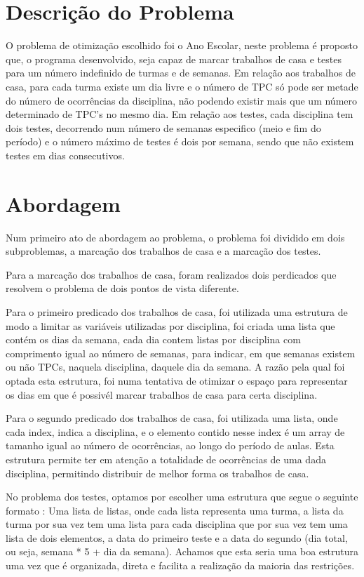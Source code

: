 \documentclass{llncs}
\begin{document}
\section{Descrição do Problema}
%
O problema de otimização escolhido foi o Ano Escolar, neste problema é proposto que, o programa desenvolvido, seja capaz de marcar trabalhos de casa e testes para um número indefinido de turmas e de semanas. Em relação aos trabalhos de casa, para cada turma existe um dia livre e o número de TPC só pode ser metade do número de ocorrências da disciplina, não podendo existir mais que um número determinado de TPC's no mesmo dia. Em relação aos testes, cada disciplina tem dois testes, decorrendo num número de semanas especifico (meio e fim do período) e o número máximo de testes é dois por semana, sendo que não existem testes em dias consecutivos.

\section{Abordagem}
%
Num primeiro ato de abordagem ao problema, o problema foi dividido em dois subproblemas, a marcação dos trabalhos de casa e a marcação dos testes.

Para a marcação dos trabalhos de casa, foram realizados dois perdicados que resolvem o problema de dois pontos de vista diferente.

Para o primeiro predicado dos trabalhos de casa, foi utilizada uma estrutura de modo a limitar as variáveis utilizadas por disciplina, foi criada uma lista que contém os dias da semana, cada dia contem listas por disciplina com comprimento igual ao número de semanas, para indicar, em que semanas existem ou não TPCs, naquela disciplina, daquele dia da semana. A razão pela qual foi optada esta  estrutura, foi numa tentativa de otimizar o espaço para representar os dias em que é possivél marcar trabalhos de casa para certa disciplina.
\newline

Para o segundo predicado dos trabalhos de casa, foi utilizada uma lista, onde cada index, indica a disciplina, e o elemento contido nesse index é um array de tamanho igual ao número de ocorrências, ao longo do período de aulas. Esta estrutura permite ter em atenção a totalidade de ocorrências de uma dada disciplina, permitindo distribuir de melhor forma os trabalhos de casa.

No problema dos testes, optamos  por escolher uma estrutura que segue o seguinte formato : Uma lista de listas, onde cada lista representa uma turma, a lista da turma por sua vez tem uma lista para cada disciplina que por sua vez tem uma lista de dois elementos, a data do primeiro teste e a data do segundo (dia total, ou seja, semana * 5 + dia da semana). Achamos que esta seria uma boa estrutura uma vez que é organizada, direta e facilita a realização da maioria das restrições.
\end{document}
